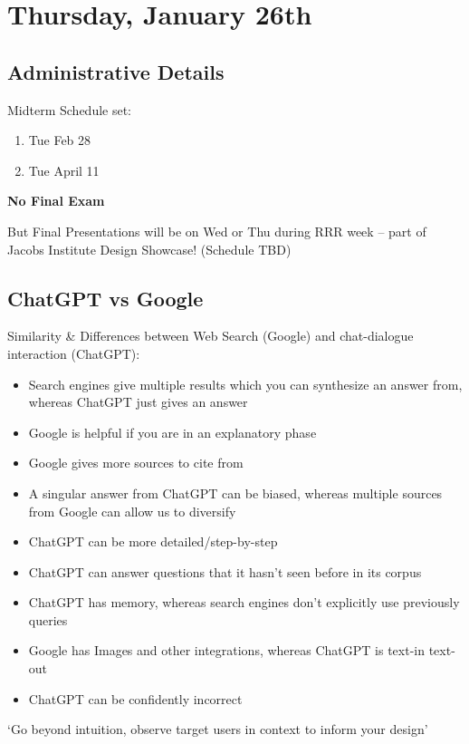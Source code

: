 \section{Thursday, January 26th}
\subsection{Administrative Details}
Midterm Schedule set:
\begin{enumerate}
    \item Tue Feb 28
    \item Tue April 11
\end{enumerate}
\textbf{No Final Exam}

But Final Presentations will be on Wed or Thu during RRR week -- part of Jacobs Institute Design Showcase! (Schedule TBD)

\subsection{ChatGPT vs Google}
Similarity \& Differences between Web Search (Google) and chat-dialogue interaction (ChatGPT):
\begin{itemize}
    \item Search engines give multiple results which you can synthesize an answer from, whereas ChatGPT just gives an answer
    \item Google is helpful if you are in an explanatory phase
    \item Google gives more sources to cite from
    \item A singular answer from ChatGPT can be biased, whereas multiple sources from Google can allow us to diversify
    \item ChatGPT can be more detailed/step-by-step
    \item ChatGPT can answer questions that it hasn't seen before  in its corpus
    \item ChatGPT has memory, whereas search engines don't explicitly use previously queries
    \item Google has Images and other integrations, whereas ChatGPT is text-in text-out
    \item ChatGPT can be confidently incorrect
\end{itemize}

\begin{shaded}
`Go beyond intuition, observe target users in context to inform your design'
\end{shaded}


